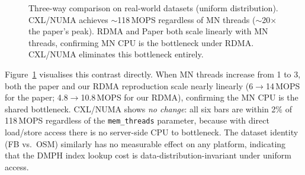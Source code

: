 \documentclass[11pt,a4paper]{article}
\begin{document}
\begin{figure}[H]
\centering
{}
\caption{Three-way comparison on real-world datasets (uniform distribution). CXL/NUMA achieves $\sim$118\,MOPS regardless of MN threads ($\sim$20$\times$ the paper's peak). RDMA and Paper both scale linearly with MN threads, confirming MN CPU is the bottleneck under RDMA. CXL/NUMA eliminates this bottleneck entirely.}
\label{fig:dataset-3way-cmp}
\end{figure}

Figure~\ref{fig:dataset-3way-cmp} visualises this contrast directly. When MN threads increase from 1 to 3, both the paper and our RDMA reproduction scale nearly linearly (6$\to$14\,MOPS for the paper; 4.8$\to$10.8\,MOPS for our RDMA), confirming the MN CPU is the shared bottleneck. CXL/NUMA shows \emph{no change}: all six bars are within 2\% of 118\,MOPS regardless of the \texttt{mem\_threads} parameter, because with direct load/store access there is no server-side CPU to bottleneck. The dataset identity (FB vs.\ OSM) similarly has no measurable effect on any platform, indicating that the DMPH index lookup cost is data-distribution-invariant under uniform access.
\end{document}

